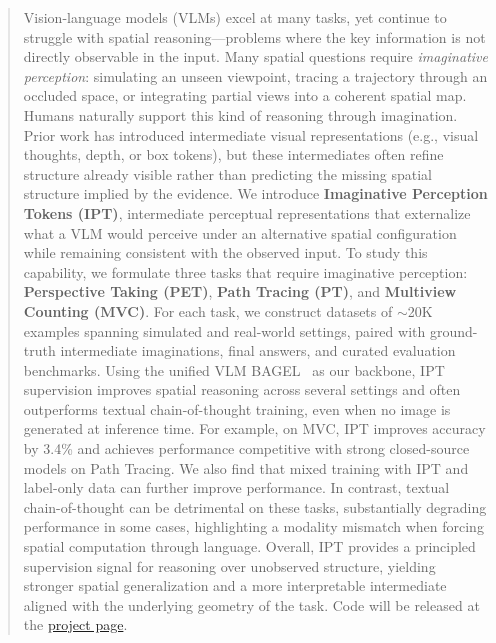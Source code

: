 \begin{abstract}
Vision-language models (VLMs) excel at many tasks, yet continue to struggle with spatial reasoning—problems where the key information is not directly observable in the input. Many spatial questions require \emph{imaginative perception}: simulating an unseen viewpoint, tracing a trajectory through an occluded space, or integrating partial views into a coherent spatial map. Humans naturally support this kind of reasoning through imagination. Prior work has introduced intermediate visual representations (e.g., visual thoughts, depth, or box tokens), but these intermediates often refine structure already visible rather than predicting the missing spatial structure implied by the evidence.
We introduce \textbf{Imaginative Perception Tokens (IPT)}, intermediate perceptual representations that externalize what a VLM would perceive under an alternative spatial configuration while remaining consistent with the observed input. To study this capability, we formulate three tasks that require imaginative perception: \textbf{Perspective Taking (PET)}, \textbf{Path Tracing (PT)}, and \textbf{Multiview Counting (MVC)}. For each task, we construct datasets of $\sim$20K examples spanning simulated and real-world settings, paired with ground-truth intermediate imaginations, final answers, and curated evaluation benchmarks.
Using the unified VLM BAGEL~\cite{deng2025bagel} as our backbone, IPT supervision improves spatial reasoning across several settings and often outperforms textual chain-of-thought training, even when no image is generated at inference time. For example, on MVC, IPT improves accuracy by 3.4\% and achieves performance competitive with strong closed-source models on Path Tracing. We also find that mixed training with IPT and label-only data can further improve performance. In contrast, textual chain-of-thought can be detrimental on these tasks, substantially degrading performance in some cases, highlighting a modality mismatch when forcing spatial computation through language. Overall, IPT provides a principled supervision signal for reasoning over unobserved structure, yielding stronger spatial generalization and a more interpretable intermediate aligned with the underlying geometry of the task. Code will be released at the \href{https://mahtabbigverdi.github.io/Imaginative-tokens.github.io/}{project page}.
\end{abstract}